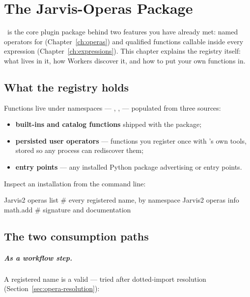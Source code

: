 \chapter{The Jarvis-Operas Package}
\label{ch:jarvis-operas}

 \Operas\ is the core plugin package
behind two features you have already met: named operators for 
(Chapter~\ref{ch:operas}) and qualified functions callable inside every expression
(Chapter~\ref{ch:expressions}). This chapter explains the registry itself: what lives
in it, how Workers discover it, and how to put your own functions in.

\section{What the registry holds}
\label{sec:operas-registry}

Functions live under namespaces --- , ,
 --- populated from three sources:

\begin{itemize}
  \item \textbf{built-ins and catalog functions} shipped with the package;
  \item \textbf{persisted user operators} --- functions you register once with
        \Operas's own tools, stored so any process can rediscover them;
  \item \textbf{entry points} --- any installed Python package advertising
         or  entry points.
\end{itemize}

Inspect an installation from the command line:

\begin{terminal}
\begin{jcmd}
Jarvis2 operas list            # every registered name, by namespace
Jarvis2 operas info math.add   # signature and documentation
\end{jcmd}
\end{terminal}

\section{The two consumption paths}
\label{sec:operas-consumption}

\paragraph{As a workflow step.} A registered name is a valid
 --- tried after dotted-import resolution
(Section~\ref{sec:opera-resolution}):

